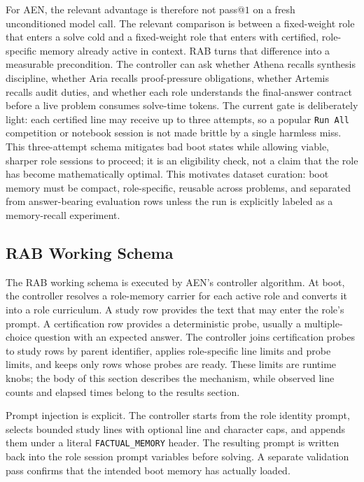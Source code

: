 \documentclass[11pt]{article}
\newcommand{\rab}{RAB}
\begin{document}
For AEN, the relevant advantage is therefore not pass@\(1\) on a fresh unconditioned model call. The relevant comparison is between a fixed-weight role that enters a solve cold and a fixed-weight role that enters with certified, role-specific memory already active in context. \rab{} turns that difference into a measurable precondition. The controller can ask whether Athena recalls synthesis discipline, whether Aria recalls proof-pressure obligations, whether Artemis recalls audit duties, and whether each role understands the final-answer contract before a live problem consumes solve-time tokens. The current gate is deliberately light: each certified line may receive up to three attempts, so a popular \texttt{Run All} competition or notebook session is not made brittle by a single harmless miss. This three-attempt schema mitigates bad boot states while allowing viable, sharper role sessions to proceed; it is an eligibility check, not a claim that the role has become mathematically optimal. This motivates dataset curation: boot memory must be compact, role-specific, reusable across problems, and separated from answer-bearing evaluation rows unless the run is explicitly labeled as a memory-recall experiment.

\subsection{RAB Working Schema}



The \rab{} working schema is executed by AEN's controller algorithm. At boot, the controller resolves a role-memory carrier for each active role and converts it into a role curriculum. A study row provides the text that may enter the role's prompt. A certification row provides a deterministic probe, usually a multiple-choice question with an expected answer. The controller joins certification probes to study rows by parent identifier, applies role-specific line limits and probe limits, and keeps only rows whose probes are ready. These limits are runtime knobs; the body of this section describes the mechanism, while observed line counts and elapsed times belong to the results section.

Prompt injection is explicit. The controller starts from the role identity prompt, selects bounded study lines with optional line and character caps, and appends them under a literal \texttt{FACTUAL\_MEMORY} header. The resulting prompt is written back into the role session prompt variables before solving. A separate validation pass confirms that the intended boot memory has actually loaded.
\end{document}
